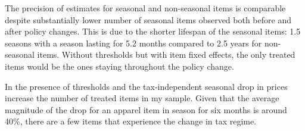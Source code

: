 \documentclass[12pt]{article}
\begin{document}
		
		The precision of estimates for seasonal and non-seasonal items is comparable despite substantially lower number of seasonal items observed both before and after policy changes. This is due to the shorter lifespan of the seasonal items: 1.5 seasons with a season lasting for 5.2 months compared to 2.5 years for non-seasonal items. Without thresholds but with item fixed effects, the only treated items would be the ones staying throughout the policy change. 
		
		
		
		In the presence of thresholds and the tax-independent seasonal drop in prices increase the number of treated items in my sample. Given that the average magnitude of the drop for an apparel item in season for six months is around 40\%, there are a few items that experience the change in tax regime.
		
		
		
\end{document}
